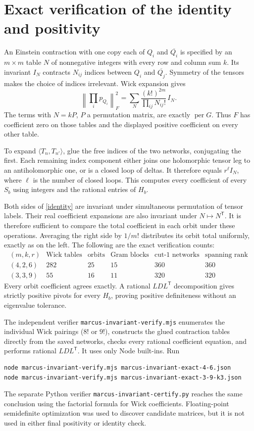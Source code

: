 \documentclass[11pt]{article}
\newcommand{\per}{\operatorname{per}}
\begin{document}
\section{Exact verification of the identity and positivity}
An Einstein contraction with one copy each of $Q_i$ and $\overline{Q_i}$ is
specified by an $m\times m$ table $N$ of nonnegative integers with every row
and column sum $k$. Its invariant $I_N$ contracts $N_{ij}$ indices between
$Q_i$ and $\overline{Q_j}$. Symmetry of the tensors makes the choice of indices
irrelevant. Wick expansion gives
\[
\left\|\prod_i p_{Q_i}\right\|_F^2
=\sum_N\frac{(k!)^{2m}}{\prod_{ij}N_{ij}!}\,I_N.
\]
The terms with $N=kP$, $P$ a permutation matrix, are exactly $\per G$.
Thus $F$ has coefficient zero on those tables and the displayed positive
coefficient on every other table.

To expand $\langle T_n,T_{n'}\rangle$, glue the free indices of the two
networks, conjugating the first. Each remaining index component either joins
one holomorphic tensor leg to an antiholomorphic one, or is a closed loop
of deltas. It therefore equals $r^\ell I_N$, where $\ell$ is the number of
closed loops. This computes every coefficient of every $S_b$ using integers
and the rational entries of $H_b$.

Both sides of \eqref{identity} are invariant under simultaneous permutation
of tensor labels. Their real coefficient expansions are also invariant under
$N\mapsto N^{\mathsf T}$. It is therefore sufficient to compare the total
coefficient in each orbit under these operations. Averaging the right side
by $1/m!$ distributes its orbit total uniformly, exactly as on the left.
The following are the exact verification counts:
\[
\begin{array}{c|r|r|r|r|r}
(m,k,r)&\text{Wick tables}&\text{orbits}&\text{Gram blocks}
&\text{cut-1 networks}&\text{spanning rank}\\\hline
(4,2,6)&282&25&15&360&360\\
(3,3,9)&55&16&11&320&320
\end{array}
\]
Every orbit coefficient agrees exactly. A rational $LDL^{\mathsf T}$
decomposition gives strictly positive pivots for every $H_b$, proving
positive definiteness without an eigenvalue tolerance.

The independent verifier \texttt{marcus-invariant-verify.mjs} enumerates
the individual Wick pairings ($8!$ or $9!$), constructs the glued contraction
tables directly from the saved networks, checks every rational coefficient
equation, and performs rational $LDL^{\mathsf T}$. It uses only Node built-ins.
Run
\begin{verbatim}
node marcus-invariant-verify.mjs marcus-invariant-exact-4-6.json
node marcus-invariant-verify.mjs marcus-invariant-exact-3-9-k3.json
\end{verbatim}
The separate Python verifier \texttt{marcus-invariant-certify.py} reaches
the same conclusion using the factorial formula for Wick coefficients.
Floating-point semidefinite optimization was used to discover candidate
matrices, but it is not used in either final positivity or identity check.
\end{document}
